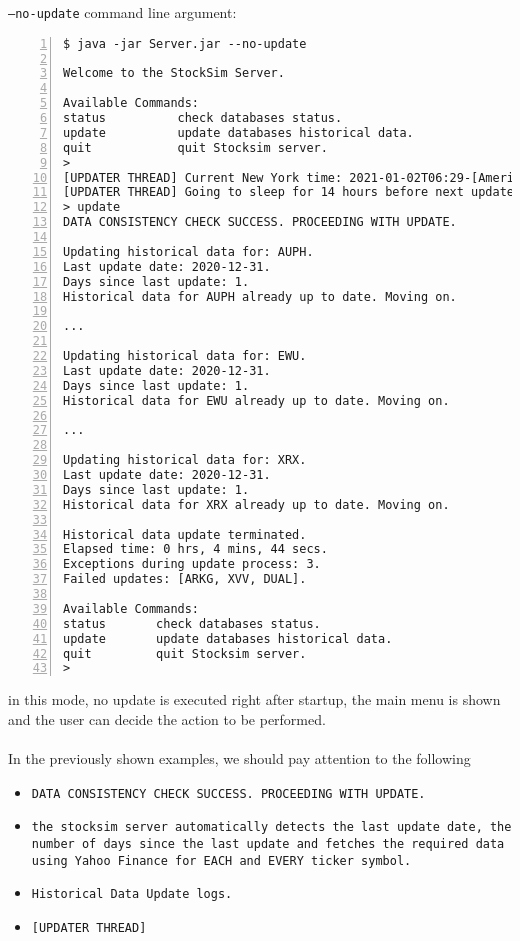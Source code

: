 \texttt{--no-update} command line argument:
\begin{lstlisting}[basicstyle=\footnotesize\ttfamily,language={},numbers=left,keepspaces=true,tabsize=4,
numberstyle=\footnotesize,numbersep=8pt,frame=single]
$ java -jar Server.jar --no-update

Welcome to the StockSim Server.

Available Commands:
status			check databases status.
update			update databases historical data.
quit			quit Stocksim server.
> 
[UPDATER THREAD] Current New York time: 2021-01-02T06:29-[America/New_York]
[UPDATER THREAD] Going to sleep for 14 hours before next update.
> update
DATA CONSISTENCY CHECK SUCCESS. PROCEEDING WITH UPDATE.

Updating historical data for: AUPH.
Last update date: 2020-12-31.
Days since last update: 1.
Historical data for AUPH already up to date. Moving on.

...

Updating historical data for: EWU.
Last update date: 2020-12-31.
Days since last update: 1.
Historical data for EWU already up to date. Moving on.

...

Updating historical data for: XRX.
Last update date: 2020-12-31.
Days since last update: 1.
Historical data for XRX already up to date. Moving on.

Historical data update terminated.
Elapsed time: 0 hrs, 4 mins, 44 secs.
Exceptions during update process: 3.
Failed updates: [ARKG, XVV, DUAL].

Available Commands:
status       check databases status.
update       update databases historical data.
quit         quit Stocksim server.
> 
\end{lstlisting}
in this mode, no update is executed right after startup, the main menu is shown
and the user can decide the action to be performed.\\
\\
In the previously shown examples, we should pay attention to the following
\begin{itemize}
    \item \texttt{DATA CONSISTENCY CHECK SUCCESS. PROCEEDING WITH UPDATE.}
    \item \texttt{the stocksim server automatically detects the last update
    date, the number of days since the last update and fetches the required
    data using Yahoo Finance for EACH and EVERY ticker symbol.}
    \item \texttt{Historical Data Update logs.}
    \item \texttt{[UPDATER THREAD]}
\end{itemize}
